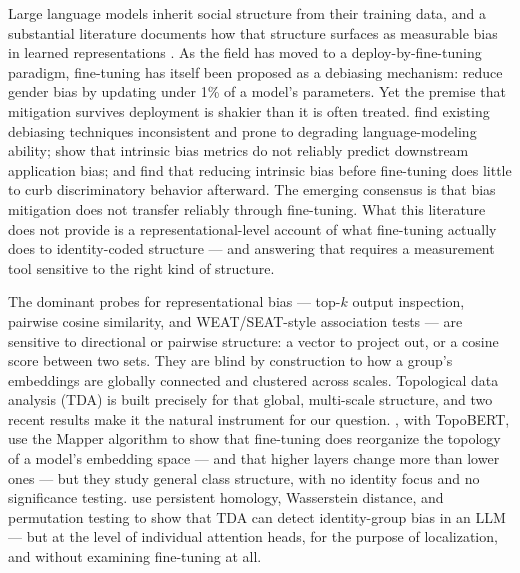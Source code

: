 \documentclass[11pt]{article}
\begin{document}
Large language models inherit social structure from their training data, and a substantial literature documents how that structure surfaces as measurable bias in learned representations \citep{caliskan2017semantics, garg2018word}. As the field has moved to a deploy-by-fine-tuning paradigm, fine-tuning has itself been proposed as a debiasing mechanism: \citet{gira-etal-2022-debiasing} reduce gender bias by updating under 1\% of a model's parameters. Yet the premise that mitigation survives deployment is shakier than it is often treated. \citet{meade-etal-2022-empirical} find existing debiasing techniques inconsistent and prone to degrading language-modeling ability; \citet{goldfarb-tarrant-etal-2021-intrinsic} show that intrinsic bias metrics do not reliably predict downstream application bias; and \citet{steed-etal-2022-upstream} find that reducing intrinsic bias before fine-tuning does little to curb discriminatory behavior afterward. The emerging consensus is that bias mitigation does not transfer reliably through fine-tuning. What this literature does not provide is a representational-level account of what fine-tuning actually does to identity-coded structure --- and answering that requires a measurement tool sensitive to the right kind of structure.

The dominant probes for representational bias --- top-$k$ output inspection, pairwise cosine similarity, and WEAT/SEAT-style association tests \citep{bolukbasi2016man, caliskan2017semantics, may-etal-2019-measuring} --- are sensitive to directional or pairwise structure: a vector to project out, or a cosine score between two sets. They are blind by construction to how a group's embeddings are globally connected and clustered across scales. Topological data analysis (TDA) is built precisely for that global, multi-scale structure, and two recent results make it the natural instrument for our question. \citet{rathore2023topobert}, with TopoBERT, use the Mapper algorithm to show that fine-tuning does reorganize the topology of a model's embedding space --- and that higher layers change more than lower ones --- but they study general class structure, with no identity focus and no significance testing. \citet{varadarajan2025augmenting} use persistent homology, Wasserstein distance, and permutation testing to show that TDA can detect identity-group bias in an LLM --- but at the level of individual attention heads, for the purpose of localization, and without examining fine-tuning at all.
\end{document}

